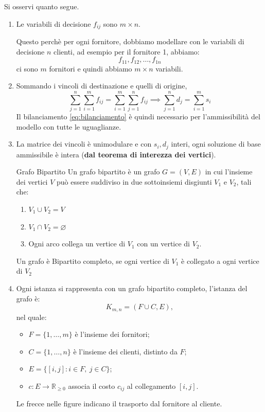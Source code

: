 Si osservi quanto segue.
\begin{enumerate}
\item[i.] Le variabili di decisione $f_{ij}$ sono $m \times n$.
\begin{observation}{}
  Questo perchè per ogni fornitore, dobbiamo modellare con le variabili di decisione $n$ clienti, ad esempio per il fornitore 1, abbiamo:
  \[
  f_{11},f_{12},\dots,f_{1n}
  \]
  ci sono $m$ fornitori e quindi abbiamo $m \times n$ variabili.
\end{observation}

\item[ii.] Sommando i vincoli di destinazione e quelli di origine,
\[
\sum_{j = 1}^{n} \sum_{i = 1}^{m} f_{ij} = \sum_{i = 1}^{m} \sum_{j = 1}^{n} f_{ij} \implies \sum_{j = 1}^{n} d_j = \sum_{i = 1}^{m} s_i  
\]
Il bilanciamento \eqref{eq:bilanciamento} è quindi necessario
per l'ammissibilità del modello con tutte le uguaglianze.

\item[iii.] La matrice dei vincoli è unimodulare e
con \(s_i,d_j\) interi, ogni soluzione di base ammissibile
è intera (\textbf{dal teorema di interezza dei vertici}).


\begin{definition}{Grafo Bipartito}
Un grafo bipartito è un grafo \(G=(V,E)\) in cui l'insieme dei vertici \(V\) può essere suddiviso in due sottoinsiemi disgiunti \(V_1\) e \(V_2\), tali che:
\begin{enumerate}
  \item \(V_1 \cup V_2 = V\)
  \item \(V_1 \cap V_2 = \varnothing\)
  \item Ogni arco collega un vertice di \(V_1\) con un vertice di \(V_2\).
\end{enumerate}
Un grafo è Bipartito completo, se ogni vertice di \(V_1\) è collegato a ogni vertice di \(V_2\)
\end{definition}

\item[iv.] Ogni istanza si rappresenta con un grafo bipartito completo, l'istanza del grafo è:
\[
K_{m,n}=(F\cup C,E),
\]
nel quale:
\begin{itemize}
\item \(F=\{1,\ldots,m\}\) è l'insieme dei fornitori;
\item \(C=\{1,\ldots,n\}\) è l'insieme dei clienti, distinto da \(F\);
\item \(E=\{[i,j]:i\in F,\ j\in C\}\);
\item \(c:E\longrightarrow\mathbb R_{\geq0}\) associa
il costo \(c_{ij}\) al collegamento \([i,j]\).
\end{itemize}
Le frecce nelle figure indicano il trasporto dal fornitore
al cliente.
\end{enumerate}


